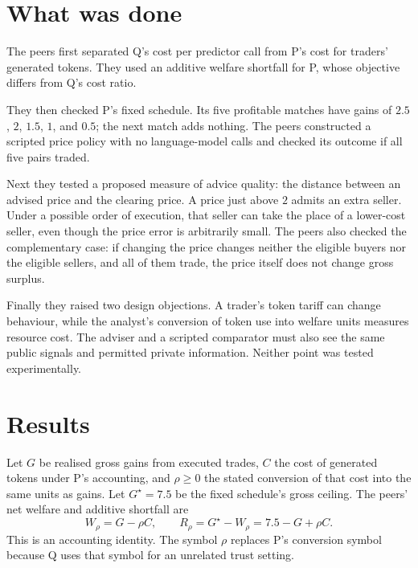 \documentclass{article}
\begin{document}
\section{What was done}

The peers first separated Q's cost per predictor call from P's cost for traders' generated tokens. They
used an additive welfare shortfall for P, whose objective differs from Q's cost ratio.

They then checked P's fixed schedule. Its five profitable matches have gains of \(2.5\), \(2\), \(1.5\),
\(1\), and \(0.5\); the next match adds nothing. The peers constructed a scripted price policy with no
language-model calls and checked its outcome if all five pairs traded.

Next they tested a proposed measure of advice quality: the distance between an advised price and the
clearing price. A price just above \(2\) admits an extra seller. Under a possible order of execution,
that seller can take the place of a lower-cost seller, even though the price error is arbitrarily small.
The peers also checked the complementary case: if changing the price changes neither the eligible buyers
nor the eligible sellers, and all of them trade, the price itself does not change gross surplus.

Finally they raised two design objections. A trader's token tariff can change behaviour, while the
analyst's conversion of token use into welfare units measures resource cost. The adviser and a scripted
comparator must also see the same public signals and permitted private information. Neither point was
tested experimentally.

\section{Results}

Let \(G\) be realised gross gains from executed trades, \(C\) the cost of generated tokens under P's
accounting, and \(\rho\geq 0\) the stated conversion of that cost into the same units as gains. Let
\(G^{\star}=7.5\) be the fixed schedule's gross ceiling. The peers' net welfare and additive shortfall
are
\[
W_{\rho}=G-\rho C,
\qquad
R_{\rho}=G^{\star}-W_{\rho}=7.5-G+\rho C.
\]
This is an accounting identity. The symbol \(\rho\) replaces P's conversion symbol because Q uses that
symbol for an unrelated trust setting.
\end{document}
